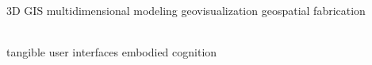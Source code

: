\documentclass[]{baharmon_cv}
\begin{document}
 \vspace{0.1em} \\ \vspace*{0.1cm}
\normalsize{
3D GIS \textbullet{} multidimensional modeling \textbullet{} geovisualization \textbullet{} geospatial fabrication}
\\
\vspace*{0.2cm}

 \vspace{0.1em} \\ \vspace*{0.1cm}
\normalsize{
tangible user interfaces \textbullet{} embodied cognition}
\\

\sectiondivider


\end{document}
